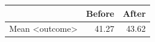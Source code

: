 \begin{tabular}{lrr}
\toprule
 & Before & After \\
\midrule
Mean <outcome> & 41.27 & 43.62 \\
\bottomrule
\end{tabular}
